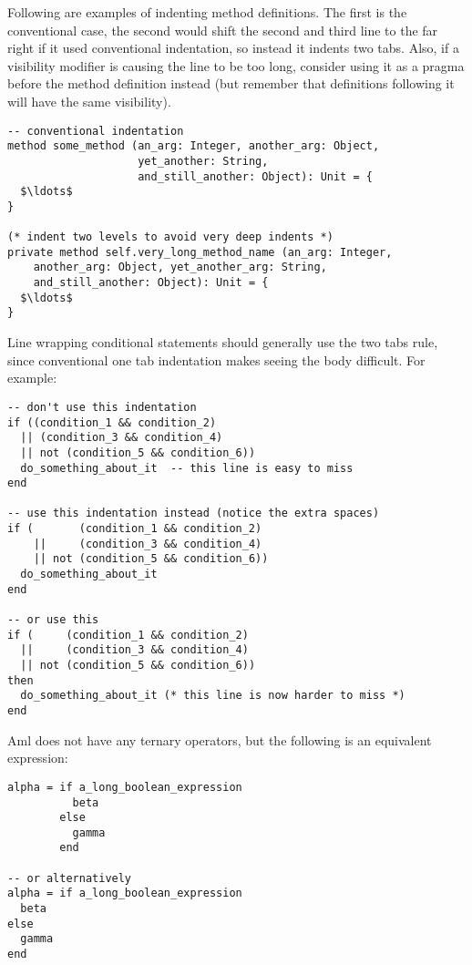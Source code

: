 \example Following are examples of indenting method definitions. The first is the conventional case, the second would shift the second and third line to the far right if it used conventional indentation, so instead it indents two tabs. Also, if a visibility modifier is causing the line to be too long, consider using it as a pragma before the method definition instead (but remember that definitions following it will have the same visibility). 

\begin{lstlisting}
-- conventional indentation
method some_method (an_arg: Integer, another_arg: Object, 
                    yet_another: String,
                    and_still_another: Object): Unit = {
  $\ldots$
}

(* indent two levels to avoid very deep indents *)
private method self.very_long_method_name (an_arg: Integer,
    another_arg: Object, yet_another_arg: String, 
    and_still_another: Object): Unit = {
  $\ldots$
}
\end{lstlisting}

\example Line wrapping conditional statements should generally use the two tabs rule, since conventional one tab indentation makes seeing the body difficult. For example: 

\begin{lstlisting}
-- don't use this indentation
if ((condition_1 && condition_2)
  || (condition_3 && condition_4)
  || not (condition_5 && condition_6))
  do_something_about_it  -- this line is easy to miss
end

-- use this indentation instead (notice the extra spaces)
if (       (condition_1 && condition_2)
    ||     (condition_3 && condition_4)
    || not (condition_5 && condition_6))
  do_something_about_it
end

-- or use this
if (     (condition_1 && condition_2)
  ||     (condition_3 && condition_4)
  || not (condition_5 && condition_6))
then
  do_something_about_it (* this line is now harder to miss *)
end
\end{lstlisting}

\example Aml does not have any ternary operators, but the following is an equivalent expression:

\begin{lstlisting}
alpha = if a_long_boolean_expression
          beta
        else
          gamma
        end

-- or alternatively
alpha = if a_long_boolean_expression
  beta
else
  gamma
end
\end{lstlisting}





